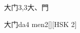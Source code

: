 \begin{entry}{大门}{3,3}{⼤、⾨}
  \begin{phonetics}{大门}{da4 men2}[][HSK 2]
  \end{phonetics}
\end{entry}
